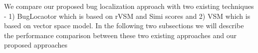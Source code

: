 \documentclass[conference]{IEEEtran}
\begin{document}
We compare our proposed bug localization approach with two existing techniques - 1) BugLocaotor \cite{Jian} which is based on rVSM and Simi scores and 2) VSM which is based on vector space model. In the following two subsections we will describe the performance comparison between these two existing approaches and our proposed approaches
\begin{table}[htbp]
	\centering
	\caption{Performance of proposed technique (VSM+Co-Occerence) Ranks}
	\label{tab:Performance2}
\end{table}
\end{document}
